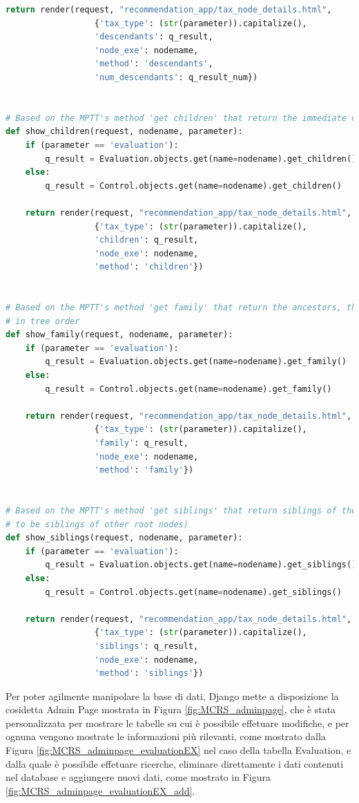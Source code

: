 \begin{lstlisting}[language=Python, caption={Parti principali del codice delle View della soluzione per gestire la navigazione 
	delle tassonomie, quella delle Evaluation e quella dei Controlli}]
	return render(request, "recommendation_app/tax_node_details.html",
				  {'tax_type': (str(parameter)).capitalize(),
				  'descendants': q_result,
				  'node_exe': nodename,
				  'method': 'descendants',
				  'num_descendants': q_result_num})


# Based on the MPTT's method 'get children' that return the immediate children of a model instance, in tree order
def show_children(request, nodename, parameter):
	if (parameter == 'evaluation'):
		q_result = Evaluation.objects.get(name=nodename).get_children()
	else:
		q_result = Control.objects.get(name=nodename).get_children()

	return render(request, "recommendation_app/tax_node_details.html",
				  {'tax_type': (str(parameter)).capitalize(),
				  'children': q_result,
				  'node_exe': nodename,
				  'method': 'children'})


# Based on the MPTT's method 'get family' that return the ancestors, the model instance itself and the descendants,
# in tree order
def show_family(request, nodename, parameter):
	if (parameter == 'evaluation'):
		q_result = Evaluation.objects.get(name=nodename).get_family()
	else:
		q_result = Control.objects.get(name=nodename).get_family()

	return render(request, "recommendation_app/tax_node_details.html",
				  {'tax_type': (str(parameter)).capitalize(),
				  'family': q_result,
				  'node_exe': nodename,
				  'method': 'family'})


# Based on the MPTT's method 'get siblings' that return siblings of the model instance (root nodes are considered
# to be siblings of other root nodes)
def show_siblings(request, nodename, parameter):
	if (parameter == 'evaluation'):
		q_result = Evaluation.objects.get(name=nodename).get_siblings()
	else:
		q_result = Control.objects.get(name=nodename).get_siblings()

	return render(request, "recommendation_app/tax_node_details.html",
				  {'tax_type': (str(parameter)).capitalize(),
				  'siblings': q_result,
				  'node_exe': nodename,
				  'method': 'siblings'})
\end{lstlisting}


Per poter agilmente manipolare la base di dati, Django mette a disposizione la cosidetta Admin Page mostrata in 
Figura \ref{fig:MCRS_adminpage}, che è stata personalizzata per mostrare le tabelle su cui è possibile
effetuare modifiche, e per ognuna vengono mostrate le informazioni più rilevanti, come mostrato dalla 
Figura \ref{fig:MCRS_adminpage_evaluationEX} nel caso della tabella Evaluation, e dalla quale è possibile 
effetuare ricerche, eliminare direttamente i dati contenuti nel database e aggiungere
nuovi dati, come mostrato in Figura \ref{fig:MCRS_adminpage_evaluationEX_add}.\\

